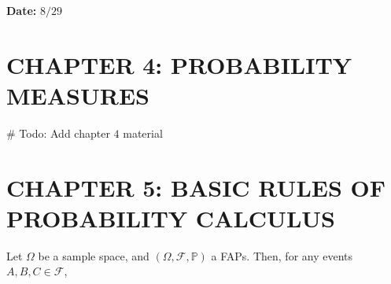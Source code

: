 \documentclass[12pt]{article}
\newcommand{\field}{\mathcal{F}}
\begin{document}
\begin{flushright}
\textbf{Date:} $8/29$ 
\end{flushright}




\section*{CHAPTER 4: PROBABILITY MEASURES}


$\#$ Todo: Add chapter $4$ material


\section*{CHAPTER 5: BASIC RULES OF PROBABILITY CALCULUS}


\noindent
Let $\Omega$ be a sample space, and $(\Omega, \field, \mathbb{P})$ a FAPs. Then, for any events $A,B,C \in \field$,
\end{document}
